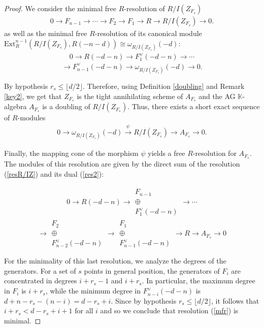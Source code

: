 \documentclass[12pt,twoside]{amsart}
\numberwithin{equation}{section} \hyphenation{semi-stable}
\newcommand{\K}{\mathbb{K}}
\theoremstyle{definition}
\begin{document}
\begin{proof}
We consider the minimal free $R$-resolution of $R/I(Z_{F_s})$   
\begin{eqnarray}\label{resR/IZ}
    0 \longrightarrow F_{n -1} \longrightarrow \cdots \longrightarrow F_{2} \longrightarrow F_{1} \longrightarrow R \longrightarrow R/I(Z_{F_s}) \longrightarrow 0. 
\end{eqnarray}
as well as the  minimal free $R$-resolution  of its canonical module $\text{Ext}_R^{n-1}(R/I(Z_{F_s}), R(-n-d)) \cong \omega_{R/I(Z_{F_s})} (-d)$:
\begin{eqnarray}\label{res2}
    0 \longrightarrow R(-d-n) \longrightarrow F_1^{\vee}(-d-n)
    \longrightarrow \cdots \end{eqnarray}
    $$\longrightarrow F_{n -1}^{\vee}(-d-n) \longrightarrow \omega_{R/I(Z_{F_s})} (-d)\longrightarrow 0.
$$


By hypothesis  $r_s \le \lfloor d/2 \rfloor$. Therefore, using Definition \ref{doubling} and Remark \ref{key2}, we get that $Z_{F_s}$ is the tight annihilating scheme of $A_{F_s}$ and the AG $\K$-algebra $A_{F_s}$ is a doubling of $R/I(Z_{F_s})$. Thus, there exists a short exact sequence of $R$-modules
\begin{eqnarray*}
    0 \longrightarrow \omega_{R/I(Z_{F_s})}(-d) \xrightarrow{\psi} R/I(Z_{F_s}) \longrightarrow A_{F_s} \longrightarrow 0.
\end{eqnarray*}

Finally,  the mapping cone of the morphism $\psi$ yields a free $R$-resolution for $A_{F_s}$. The modules of this resolution are given by the direct sum of the resolution (\ref{resR/IZ}) and its dual  (\ref{res2}):

\begin{eqnarray}\label{mfr}
        0\longrightarrow  R(-d-n)  \longrightarrow  \begin{array}{c} F_{n-1} \\ \oplus \\ F_1^{\vee}(-d-n) \end{array}\longrightarrow \cdots
        \end{eqnarray}
        $$
        \longrightarrow \begin{array}{c} F_2 \\  \oplus \\ F_{n-2}^{\vee}(-d-n)  \end{array}
\longrightarrow \begin{array}{c} F_1 \\ \oplus \\ F_{n-1}^{\vee}(-d-n) \end{array} \longrightarrow R\longrightarrow A_{F_s} \longrightarrow 0
$$

  For the minimality of this last resolution, we analyze the degrees of the generators. For a set of $s$ points in general position, the generators of $F_i$ are concentrated in degrees $i+r_s-1$ and $i+r_s$. In particular, the maximum degree in $F_i$ is $i+r_s$, while the minimum degree in $F_{n-i}^{\vee}(-d-n)$ is $d+n-r_s-(n-i)=d-r_s+i$. Since by hypothesis $r_s \le \lfloor d/2 \rfloor$, it follows that $i+r_s < d-r_s+i+1$ for all $i$ and  so we conclude that resolution  (\ref{mfr}) is minimal.
\end{proof}
\end{document}
